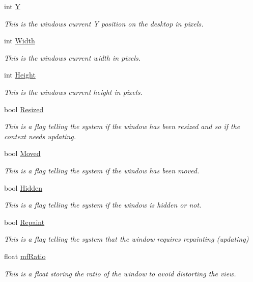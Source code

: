\begin{DoxyCompactItemize}
int \hyperlink{classc_window_ab14f20c05d88b8e620a3a0a7aa85d331}{Y}
\begin{DoxyCompactList}\small\item\em This is the windows current Y position on the desktop in pixels. \item\end{DoxyCompactList}\item 
int \hyperlink{classc_window_af50a65d8b98d34123714c555fbe02cba}{Width}
\begin{DoxyCompactList}\small\item\em This is the windows current width in pixels. \item\end{DoxyCompactList}\item 
int \hyperlink{classc_window_a6e20b3f2dec19a97a0a7e536c9920b26}{Height}
\begin{DoxyCompactList}\small\item\em This is the windows current height in pixels. \item\end{DoxyCompactList}\item 
bool \hyperlink{classc_window_abe671e06a64e2e044dcf7c074ba579be}{Resized}
\begin{DoxyCompactList}\small\item\em This is a flag telling the system if the window has been resized and so if the context needs updating. \item\end{DoxyCompactList}\item 
bool \hyperlink{classc_window_a996dd0906b9bfa7686275febad69d05e}{Moved}
\begin{DoxyCompactList}\small\item\em This is a flag telling the system if the window has been moved. \item\end{DoxyCompactList}\item 
bool \hyperlink{classc_window_aaff5335e44eb273754bc883b1a4a0dfc}{Hidden}
\begin{DoxyCompactList}\small\item\em This is a flag telling the system if the window is hidden or not. \item\end{DoxyCompactList}\item 
bool \hyperlink{classc_window_a41a2b92f962e385d7f11f099246b4264}{Repaint}
\begin{DoxyCompactList}\small\item\em This is a flag telling the system that the window requires repainting (updating) \item\end{DoxyCompactList}\item 
float \hyperlink{classc_window_ab13b4b341110b53959a17092d5a415da}{mfRatio}
\begin{DoxyCompactList}\small\item\em This is a float storing the ratio of the window to avoid distorting the view. \item\end{DoxyCompactList}\end{DoxyCompactItemize}
